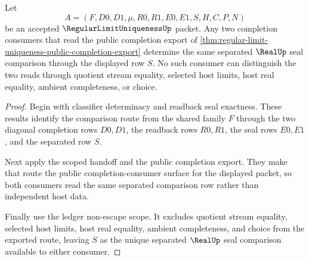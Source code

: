 \begin{theorem}
\label{thm:regular-limit-uniqueness-consumer-determinacy}
Let
$$
A=(F,D0,D1,\mu,R0,R1,E0,E1,S,H,C,P,N)
$$
be an accepted $\RegularLimitUniquenessUp$ packet. Any two completion consumers that read the public completion export of \autoref{thm:regular-limit-uniqueness-public-completion-export} determine the same separated $\RealUp$ seal comparison through the displayed row $S$. No such consumer can distinguish the two reads through quotient stream equality, selected host limits, host real equality, ambient completeness, or choice.
\end{theorem}
\begin{proof}
Begin with classifier determinacy and readback seal exactness. These results identify the comparison route from the shared family $F$ through the two diagonal completion rows $D0,D1$, the readback rows $R0,R1$, the seal rows $E0,E1$, and the separated row $S$.

Next apply the scoped handoff and the public completion export. They make that route the public completion-consumer surface for the displayed packet, so both consumers read the same separated comparison row rather than independent host data.

Finally use the ledger non-escape scope. It excludes quotient stream equality, selected host limits, host real equality, ambient completeness, and choice from the exported route, leaving $S$ as the unique separated $\RealUp$ seal comparison available to either consumer.
\end{proof}

